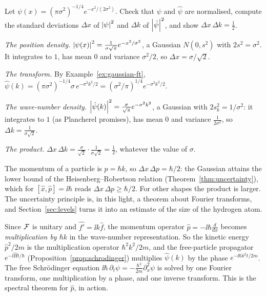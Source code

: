 \begin{example}\label{ex:gaussian-uncertainty}
  Let $\psi(x)=(\pi\sigma^2)^{-1/4}e^{-x^2/(2\sigma^2)}$. Check that $\psi$ and $\hat\psi$ are normalised, compute the standard deviations $\Delta x$ of $\left|\psi\right|^2$ and $\Delta k$ of $\left|\hat\psi\right|^2$, and show $\Delta x\,\Delta k=\tfrac12$.
\end{example}
\begin{solution}
  \begin{steps}
    \item \emph{The position density.} $\left|\psi(x)\right|^2=\frac1{\sigma\sqrt\pi}e^{-x^2/\sigma^2}$, a Gaussian $N(0,s^2)$ with $2s^2=\sigma^2$. It integrates to $1$, has mean $0$ and variance $\sigma^2/2$, so $\Delta x=\sigma/\sqrt2$.
    \item \emph{The transform.} By Example~\ref{ex:gaussian-ft}, $\hat\psi(k)=(\pi\sigma^2)^{-1/4}\sigma\,e^{-\sigma^2k^2/2}=(\sigma^2/\pi)^{1/4}e^{-\sigma^2k^2/2}$.
    \item \emph{The wave-number density.} $\left|\hat\psi(k)\right|^2=\frac\sigma{\sqrt\pi}e^{-\sigma^2k^2}$, a Gaussian with $2s_k^2=1/\sigma^2$: it integrates to $1$ (as Plancherel promises), has mean $0$ and variance $\frac1{2\sigma^2}$, so $\Delta k=\frac1{\sigma\sqrt2}$.
    \item \emph{The product.} $\Delta x\,\Delta k=\frac\sigma{\sqrt2}\cdot\frac1{\sigma\sqrt2}=\frac12$, whatever the value of $\sigma$.
  \end{steps}
\end{solution}

The momentum of a particle is $p=\hbar k$, so $\Delta x\,\Delta p=\hbar/2$: the Gaussian attains the lower bound of the Heisenberg--Robertson relation (Theorem~\ref{thm:uncertainty}), which for $[\hat x,\hat p]=\ii\hbar$ reads $\Delta x\,\Delta p\ge\hbar/2$. For other shapes the product is larger. The uncertainty principle is, in this light, a theorem about Fourier transforms, and Section~\ref{sec:levels} turns it into an estimate of the size of the hydrogen atom.

\begin{lookahead}
  Since $\mathcal{F}$ is unitary and $\widehat{f'}=\ii k\hat f$, the momentum operator $\hat p=-\ii\hbar\frac{d}{dx}$ becomes \emph{multiplication by $\hbar k$} in the wave-number representation. So the kinetic energy $\hat p^2/2m$ is the multiplication operator $\hbar^2k^2/2m$, and
  the free-particle propagator $e^{-\ii\hat Ht/\hbar}$ (Proposition~\ref{prop:schrodinger}) multiplies $\hat\psi(k)$ by the phase $e^{-\ii\hbar k^2t/2m}$. The free Schr\"odinger equation $\ii\hbar\,\partial_t\psi=-\frac{\hbar^2}{2m}\partial_x^2\psi$ is solved by one Fourier transform, one multiplication by a phase, and one inverse transform.
  This is the spectral theorem for $\hat p$, in action.
\end{lookahead}

